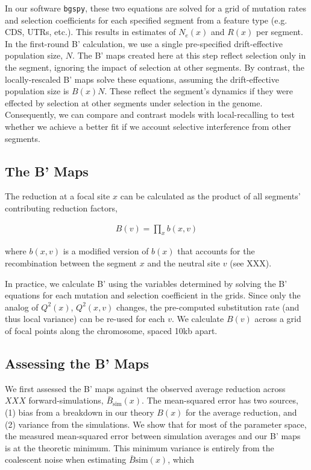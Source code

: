\documentclass[11pt]{article}
\begin{document}
In our software \texttt{bgspy}, these two equations are solved for a grid of
mutation rates and selection coefficients for each specified segment from a
feature type (e.g. CDS, UTRs, etc.). This results in estimates of $N_e(x)$ and
$R(x)$ per segment. In the first-round B' calculation, we use a single
pre-specified drift-effective population size, $N$. The B' maps created here at
this step reflect selection only in the segment, ignoring the impact of
selection at other segments. By contrast, the locally-rescaled B' maps solve
these equations, assuming the drift-effective population size is $B(x)N$. These
reflect the segment's dynamics if they were effected by selection at other
segments under selection in the genome. Consequently, we can compare and
contrast models with local-recalling to test whether we achieve a better fit if
we account selective interference from other segments.

\subsection*{The B' Maps}

The reduction at a focal site $x$ can be calculated as the product of all
segments' contributing reduction factors, 

\begin{align}
  B(v) = \prod_x b(x,v)
\end{align}

where $b(x, v)$ is a modified version of $b(x)$ that accounts for the
recombination between the segment $x$ and the neutral site $v$ (see XXX).

In practice, we calculate B' using the variables determined by solving the B'
equations for each mutation and selection coefficient in the grids. Since only
the analog of $Q^2(x)$, $Q^2(x, v)$ changes, the pre-computed substitution rate
(and thus local variance) can be re-used for each $v$. We calculate $B(v)$
across a grid of focal points along the chromosome, spaced 10kb apart.

\subsection*{Assessing the B' Maps}

We first assessed the B' maps against the observed average reduction across
$XXX$ forward-simulations, $\bar{B}_\text{sim}(x)$. The mean-squared error has
two sources, (1) bias from a breakdown in our theory $B(x)$ for the average
reduction, and (2) variance from the simulations. We show that for most of the
parameter space, the measured mean-squared error between simulation averages
and our B' maps is at the theoretic minimum. This minimum variance is entirely
from the coalescent noise when estimating $\bar{B}\text{sim}(x)$, which 
\end{document}
